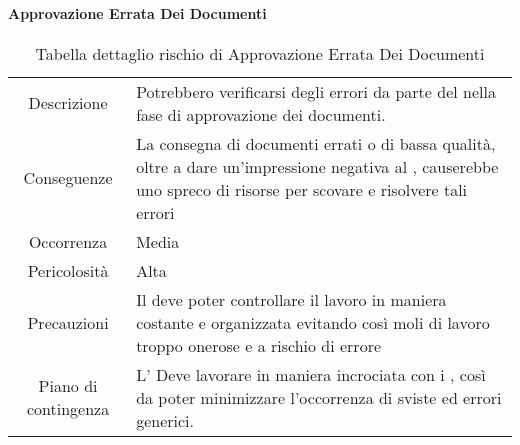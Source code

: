 \paragraph*{Approvazione Errata Dei Documenti}
\renewcommand{\arraystretch}{1}
    \begin{table}[H]
        \begin{center}
            \setlength{\aboverulesep}{0pt}
            \setlength{\belowrulesep}{0pt}
            \setlength{\extrarowheight}{.75ex}
            \begin{tabular}{ c p{10cm} }
                \rowcolor{AzzurroGruppo!10} 
                \toprule
                Descrizione & Potrebbero verificarsi degli errori da parte del \RdP{} nella fase di approvazione dei documenti. \\
                Conseguenze & La consegna di documenti errati o di bassa qualità, oltre a dare un'impressione negativa al \proponente{}, causerebbe uno spreco di risorse per scovare e risolvere tali errori \\
                Occorrenza & Media \\
                Pericolosità & Alta \\
                Precauzioni & Il \RdP{} deve poter controllare il lavoro in maniera costante e organizzata evitando così moli di lavoro troppo onerose e a rischio di errore \\
                Piano di contingenza & L'\RdP{} Deve lavorare in maniera incrociata con i \vers{}, così da poter minimizzare l'occorrenza di sviste ed errori generici. \\
                \bottomrule
            \end{tabular}
            \caption{Tabella dettaglio rischio di Approvazione Errata Dei Documenti}
        \end{center}
    \end{table}

